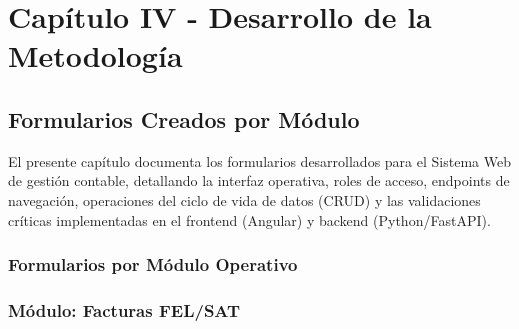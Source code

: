 \section{Capítulo IV - Desarrollo de la Metodología}
\label{cap:capitulo4}

\subsection{Formularios Creados por Módulo}

El presente capítulo documenta los formularios desarrollados para el Sistema Web de gestión contable, detallando la interfaz operativa, roles de acceso, endpoints de navegación, operaciones del ciclo de vida de datos (CRUD) y las validaciones críticas implementadas en el frontend (Angular) y backend (Python/FastAPI).

\subsubsection{Formularios por Módulo Operativo}

\subsubsection{Módulo: Facturas FEL/SAT}

